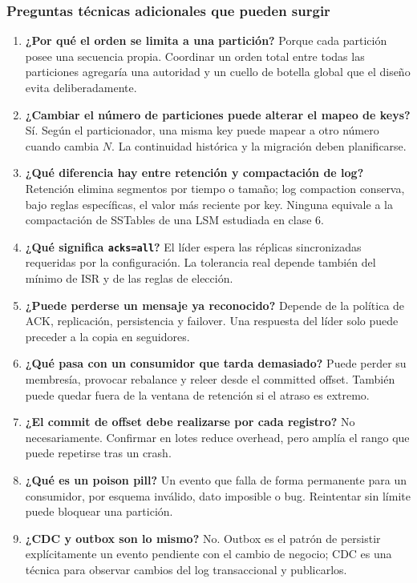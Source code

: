 \documentclass[variant=docente,cover=institutional,mode=screen]{ua-engineering-v6-article}
\begin{document}
\subsubsection*{Preguntas técnicas adicionales que pueden surgir}

\begin{enumerate}
\item \textbf{¿Por qué el orden se limita a una partición?} Porque cada partición posee una secuencia propia. Coordinar un orden total entre todas las particiones agregaría una autoridad y un cuello de botella global que el diseño evita deliberadamente.
\item \textbf{¿Cambiar el número de particiones puede alterar el mapeo de keys?} Sí. Según el particionador, una misma key puede mapear a otro número cuando cambia $N$. La continuidad histórica y la migración deben planificarse.
\item \textbf{¿Qué diferencia hay entre retención y compactación de log?} Retención elimina segmentos por tiempo o tamaño; log compaction conserva, bajo reglas específicas, el valor más reciente por key. Ninguna equivale a la compactación de SSTables de una LSM estudiada en clase 6.
\item \textbf{¿Qué significa \texttt{acks=all}?} El líder espera las réplicas sincronizadas requeridas por la configuración. La tolerancia real depende también del mínimo de ISR y de las reglas de elección.
\item \textbf{¿Puede perderse un mensaje ya reconocido?} Depende de la política de ACK, replicación, persistencia y failover. Una respuesta del líder solo puede preceder a la copia en seguidores.
\item \textbf{¿Qué pasa con un consumidor que tarda demasiado?} Puede perder su membresía, provocar rebalance y releer desde el committed offset. También puede quedar fuera de la ventana de retención si el atraso es extremo.
\item \textbf{¿El commit de offset debe realizarse por cada registro?} No necesariamente. Confirmar en lotes reduce overhead, pero amplía el rango que puede repetirse tras un crash.
\item \textbf{¿Qué es un poison pill?} Un evento que falla de forma permanente para un consumidor, por esquema inválido, dato imposible o bug. Reintentar sin límite puede bloquear una partición.
\item \textbf{¿CDC y outbox son lo mismo?} No. Outbox es el patrón de persistir explícitamente un evento pendiente con el cambio de negocio; CDC es una técnica para observar cambios del log transaccional y publicarlos.

\end{enumerate}
\end{document}
